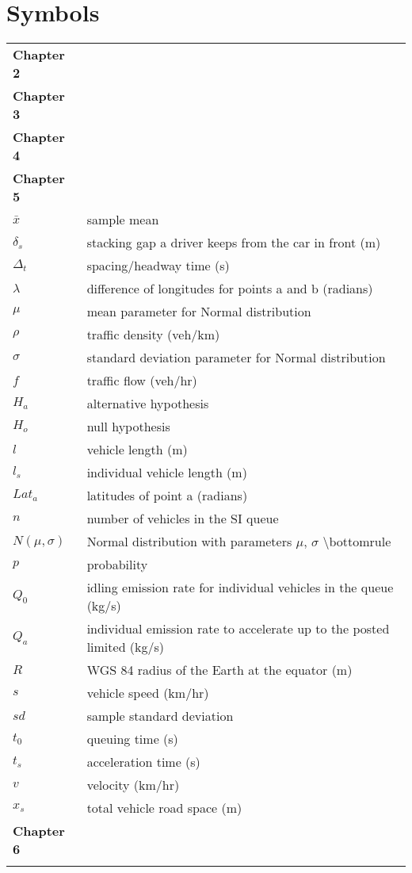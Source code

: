 \chapter*{Symbols}

\ssp
\small

\begin{longtable}{ll}
\textbf{Chapter 2}\\
\bigskip
\textbf{Chapter 3}\\
\bigskip
\textbf{Chapter 4}\\
\bigskip
\textbf{Chapter 5}\\
\bigskip
$\bar{x}$ & sample mean \\
$\delta_{s}$ & stacking gap a driver keeps from the car in front (m) \\
$\Delta_{t}$ & spacing/headway time (s) \\
$\lambda$ & difference of longitudes for points a and b (radians) \\
$\mu$ & mean parameter for Normal distribution \\
$\rho$ & traffic density (veh/km) \\
$\sigma$ & standard deviation parameter for Normal distribution \\
$f$ & traffic flow (veh/hr) \\
$H_{a}$ & alternative hypothesis \\
$H_{o}$ & null hypothesis \\
$l$ & vehicle length (m) \\
$l_{s}$ & individual vehicle length (m) \\
$Lat_{a}$ & latitudes of point a (radians) \\
$n$ & number of vehicles in the SI queue \\
$N(\mu,\sigma)$ & Normal distribution with parameters $\mu$, $\sigma$  \textbackslash{}bottomrule \\
$p$ & probability \\
$Q_{0}$ & idling emission rate for individual vehicles in the queue (kg/s) \\
$Q_{a}$ & individual emission rate to accelerate up to the posted limited (kg/s) \\
$R$ & WGS 84 radius of the Earth at the equator (m) \\
$s$ & vehicle speed (km/hr) \\
$sd$ & sample standard deviation \\
$t_{0}$ & queuing time (s) \\
$t_{s}$ & acceleration time (s) \\
$v$ & velocity (km/hr) \\
$x_{s}$ & total vehicle road space (m)\\
\bigskip
\textbf{Chapter 6}\\









\\ \hline
\end{longtable}

\clearpage